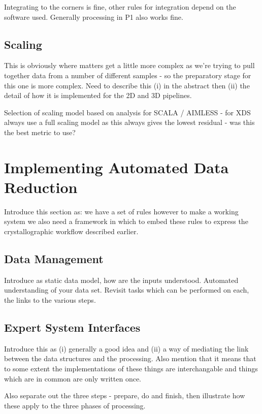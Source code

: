 \documentclass[a4paper,11pt]{article}
\begin{document}
Integrating to the corners is fine, other rules for integration depend
on the software used. Generally processing in P1 also works fine.

\subsection{Scaling}

This is obviously where matters get a little more complex as we're
trying to pull together data from a number of different samples - so
the preparatory stage for this one is more complex. Need to describe
this (i) in the abstract then (ii) the detail of how it is implemented
for the 2D and 3D pipelines.

Selection of scaling model based on analysis for SCALA / AIMLESS - for
XDS always use a full scaling model as this always gives the lowest
residual - was this the best metric to use?

\section{Implementing Automated Data Reduction}

Introduce this section as: we have a set of rules however to make a
working system we also need a framework in which to embed these rules
to express the crystallographic workflow described earlier.

\subsection{Data Management}

Introduce as static data model, how are the inputs
understood. Automated understanding of your data set. Revisit tasks
which can be performed on each, the links to the various steps.

\subsection{Expert System Interfaces}

Introduce this as (i) generally a good idea and (ii) a way of
mediating the link between the data structures and the
processing. Also mention that it means that to some extent the
implementations of these things are interchangable and things which
are in common are only written once.

Also separate out the three steps - prepare, do and finish, then
illustrate how these apply to the three phases of processing.
\end{document}
